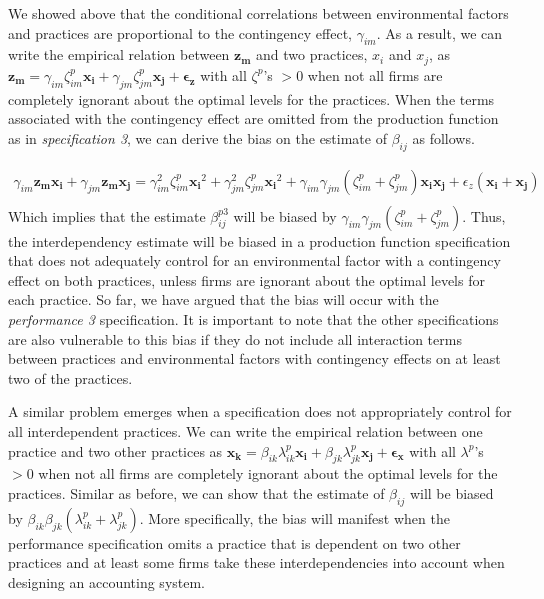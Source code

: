\documentclass[12pt]{article}
\begin{document}
We showed above that the conditional correlations between environmental factors and practices are proportional to the contingency effect, $\gamma_{im}$. As a result, we can write the empirical relation between $\mathbf{z_m}$ and two practices, $x_i$ and $x_j$, as $\mathbf{z_m} = \gamma_{im} \zeta^p_{im} \mathbf{x_i} + \gamma_{jm} \zeta^p_{jm} \mathbf{x_j} + \mathbf{\epsilon_z}$ with all $\zeta^p$'s $>0$ when not all firms are completely ignorant about the optimal levels for the practices.  When the terms associated with the contingency effect are omitted from the production function as in \emph{specification 3}, we can derive the bias on the estimate of $\beta_{ij}$ as follows.

\begin{align*}
\gamma_{im} \mathbf{z_m} \mathbf{x_i} + \gamma_{jm} \mathbf{z_m} \mathbf{x_j}
= \gamma^2_{im} \zeta^p_{im} \mathbf{x_i}^2 + \gamma^2_{jm} \zeta^p_{jm} \mathbf{x_i}^2 
    + \gamma_{im} \gamma_{jm} (\zeta^p_{im} + \zeta^p_{jm}) \mathbf{x_i x_j} 
    + \epsilon_z ( \mathbf{x_i} + \mathbf{x_j})\\
\end{align*}
Which implies that the estimate $\beta^{p3}_{ij}$ will be biased by $\gamma_{im} \gamma_{jm}(\zeta^p_{im} + \zeta^p_{jm})$. Thus, the interdependency estimate will be biased in a production function specification that does not adequately control for an environmental factor with a contingency effect on both practices, unless firms are ignorant about the optimal levels for each practice. So far, we have argued that the bias will occur with the \emph{performance 3} specification. It is important to note that the other specifications are also vulnerable to this bias if they do not include all interaction terms between practices and environmental factors with contingency effects on at least two of the practices. 

A similar problem emerges when a specification does not appropriately control for all interdependent practices. We can write the empirical relation between one practice and two other practices as $\mathbf{x_k} = \beta_{ik} \lambda^p_{ik} \mathbf{x_i} + \beta_{jk} \lambda^p_{jk} \mathbf{x_j} + \mathbf{\epsilon_x}$ with all $\lambda^p$'s $>0$ when not all firms are completely ignorant about the optimal levels for the practices. Similar as before, we can show that the estimate of $\beta_{ij}$ will be biased by $\beta_{ik} \beta_{jk} (\lambda^p_{ik} + \lambda^p_{jk})$. More specifically, the bias will manifest when the performance specification omits a practice that is dependent on two other practices and at least some firms take these interdependencies into account when designing an accounting system.
\end{document}
